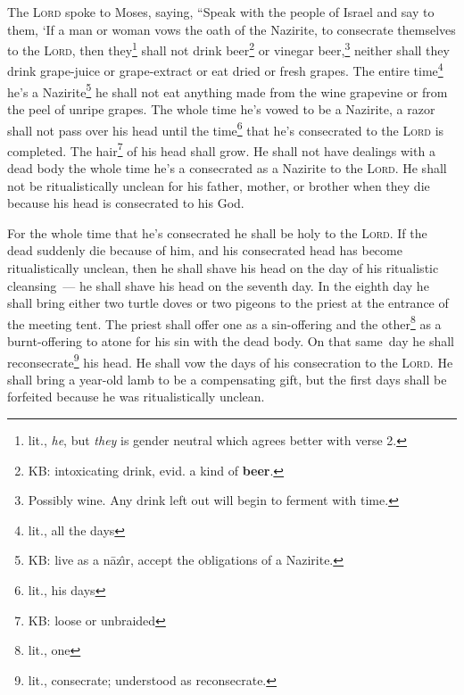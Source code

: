 
\begin{inparaenum}
     The \textsc{Lord} spoke to Moses, saying,%
     ``Speak with the people of Israel and say to them, `If a man or woman vows the oath of the Nazirite, to consecrate themselves to the \textsc{Lord},%
     then they\footnote{lit., \textit{he}, but \textit{they} is gender neutral which agrees better with verse 2.} shall not drink beer\footnote{KB: intoxicating drink, evid\@. a kind of \textbf{beer}.} or vinegar beer,\footnote{Possibly wine. Any drink left out will begin to ferment with time.} neither shall they drink grape-juice or grape-extract or eat dried or fresh grapes.%
     The entire time\footnote{lit., all the days} he's a Nazirite\footnote{KB: live as a n\=az\^\i{}r, accept the obligations of a Nazirite.} he shall not eat anything made from the wine grapevine or from the peel of unripe grapes.%
     The whole time he's vowed to be a Nazirite, a razor shall not pass over his head until the time\footnote{lit., his days} that he's consecrated to the \textsc{Lord} is completed. The hair\footnote{KB: loose or unbraided} of his head shall grow.%
     He shall not have dealings with a dead body the whole time he's a consecrated as a Nazirite to the \textsc{Lord}.%
     He shall not be ritualistically unclean for his father, mother, or brother when they die because his head is consecrated to his God.%
    
     For the whole time that he's consecrated he shall be holy to the \textsc{Lord}.%
     If the dead suddenly die because of him, and his consecrated head has become ritualistically unclean, then he shall shave his head on the day of his ritualistic cleansing~--- he shall shave his head on the seventh day.%
     In the eighth day he shall bring either two turtle doves or two pigeons to the priest at the entrance of the meeting tent.%
     The priest shall offer one as a sin-offering and the other\footnote{lit., one} as a burnt-offering to atone for his sin with the dead body. On that same\understood\ day he shall reconsecrate\footnote{lit., consecrate; understood as reconsecrate.} his head.%
     He shall vow the days of his consecration to the \textsc{Lord}. He shall bring a year-old lamb to be a compensating gift, but the first days shall be forfeited because he was ritualistically unclean.%
    

\end{inparaenum}
